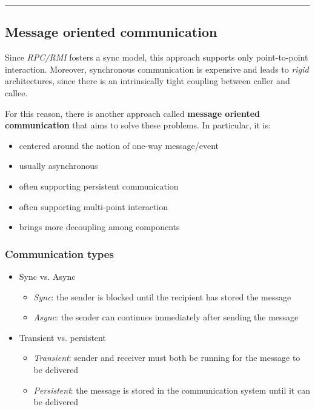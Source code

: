 \begin{center}\rule{3in}{0.4pt}\end{center}

\subsection{Message oriented communication}

Since \textit{RPC/RMI} fosters a sync model, this approach supports only point-to-point interaction. Moreover, synchronous communication is expensive and leads to \textit{rigid} architectures, since there is an intrinsically tight coupling between caller and callee.

For this reason, there is another approach called \textbf{message oriented communication} that aims to solve these problems. In particular, it is:

\begin{itemize}
    \item centered around the notion of one-way message/event
    \item usually asynchronous
    \item often supporting persistent communication
    \item often supporting multi-point interaction
    \item brings more decoupling among components
\end{itemize}

\subsubsection{Communication types}

\begin{itemize}
    \item Sync vs. Async
    \begin{itemize}
        \item \textit{Sync}: the sender is blocked until the recipient has stored the message
        \item \textit{Async}: the sender can continues immediately after sending the message
    \end{itemize}

    \item Transient vs. persistent
    \begin{itemize}
        \item \textit{Transient}: sender and receiver must both be running for the message to be delivered
        \item \textit{Persistent}: the message is stored in the communication system until it can be delivered
    \end{itemize}
\end{itemize}

